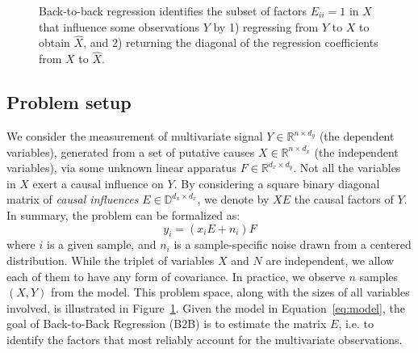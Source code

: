 \documentclass[preprint,12pt,3p]{elsarticle}
\begin{document}
\begin{figure}[t!]
  \caption{Back-to-back regression identifies the subset of factors $E_{ii} = 1$ in $X$ that influence some observations $Y$ by 1) regressing from $Y$ to $X$ to obtain $\hat{X}$, and 2) returning the diagonal of the regression coefficients from $X$ to $\hat{X}$.}
\label{fig:b2b}
\end{figure}

\subsection{Problem setup}

We consider the measurement of multivariate signal $Y \in \mathbb{R}^{n \times
d_y}$ (the dependent variables), generated from a set of putative causes $X \in \mathbb{R}^{n \times
d_x}$ (the independent variables), via some unknown linear apparatus $F \in \mathbb{R}^{d_x \times d_y}$.
%
Not all the variables in $X$ exert a causal influence on $Y$.
%
By considering a square binary diagonal matrix of \emph{causal influences} $E
\in \mathbb{D}^{d_x \times d_x}$, we denote by $XE$ the causal factors of $Y$.
%
In summary, the problem can be formalized as:
%
\begin{equation}
    y_i = (x_i E + n_i) F
    \label{eq:model}
\end{equation}
%
where $i$ is a given sample, and $n_i$ is a sample-specific noise drawn from a
centered distribution.
%
While the triplet of variables $X$ and $N$ are independent, we allow each of
them to have any form of covariance.
%
In practice, we observe $n$ samples $(X, Y)$ from the model.
%
This problem space, along with the sizes of all variables involved, is
illustrated in Figure~\ref{fig:b2b}.
%
Given the model in Equation~\cref{eq:model}, the goal of Back-to-Back
Regression (B2B) is to estimate the matrix $E$, i.e. to identify the factors
that most reliably account for the multivariate observations.
\end{document}
